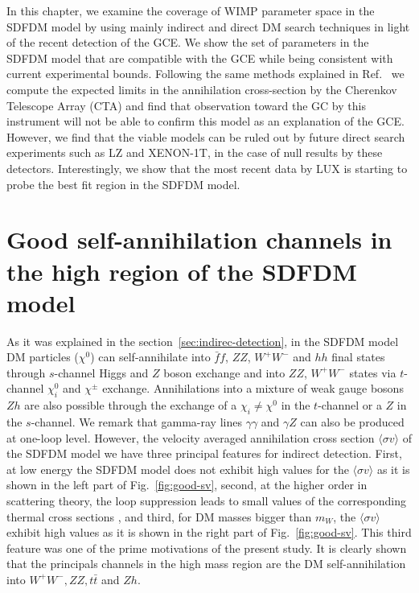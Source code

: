 In this chapter, we examine the coverage of WIMP parameter space in the SDFDM model by using mainly indirect and direct DM search techniques in light of the recent detection of the GCE. We show the set of parameters in the SDFDM model that are compatible with the GCE while being consistent with current experimental bounds. Following the same methods explained in Ref.~\cite{Silverwood:2014yza} we compute the expected limits in the annihilation cross-section by the Cherenkov Telescope Array (CTA) and find that observation toward the GC by this instrument will not be able to confirm this model as an explanation of the GCE. However, we find that the viable models can be ruled out by future
direct search experiments such as LZ and XENON-1T, in the case of null results by these detectors. Interestingly, we show that the most recent data by LUX is starting to probe the best fit region in the SDFDM model.











\section{Good self-annihilation channels in the high region of the SDFDM model}
\label{sec:modelgce}

As it was explained in the section~\ref{sec:indirec-detection}, in the SDFDM model DM particles ($\chi^0$) can self-annihilate into $\bar{f}f$, $ZZ$, $W^+W^-$ and $hh$ final states through  $s$-channel Higgs and $Z$ boson exchange and into $ZZ$, $W^+W^-$ states via $t$-channel $\chi_i^0$ and $\chi^{\pm}$ exchange. Annihilations into a mixture of weak gauge bosons $Zh$ are also possible through the exchange of a $\chi_i\neq\chi^0$  in the $t$-channel or a $Z$ in the $s$-channel.  We remark that gamma-ray lines $\gamma\gamma$ and $\gamma Z$ can also be produced at one-loop level. 
%
However, the velocity averaged annihilation cross section $\langle\sigma v\rangle$ of the SDFDM model we have three principal features for indirect detection. First, at low energy the SDFDM model does not exhibit high values for the $\langle\sigma v\rangle$ as it is shown in the left part of Fig.~\ref{fig:good-sv}, 
%
second, at the higher order in scattering theory, the loop suppression leads to small values of the corresponding thermal cross sections \cite{Calibbi:2015nha}, 
%
and third, for DM masses bigger than $m_W$, the $\langle\sigma v\rangle$ exhibit high values as it is shown in the right part of Fig.~\ref{fig:good-sv}.
%
This third feature was one of the prime motivations of the present study. It is clearly shown that the principals channels in the high mass region are the DM self-annihilation into $W^+W^-, ZZ, t\bar{t}$ and $Zh$. 

